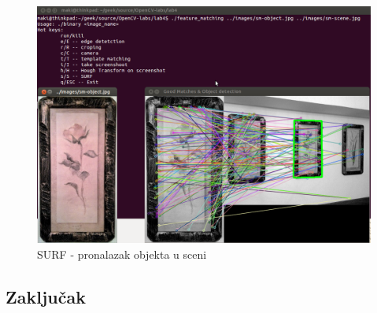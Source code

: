 \begin{figure}[h]
\centering
\includegraphics[scale=0.42]{images/lab4-surf-01.png}
\caption{SURF - pronalazak objekta u sceni}
\label{fig:lab4-surf-01}
\end{figure}

\newpage
\subsection{Zaključak}
